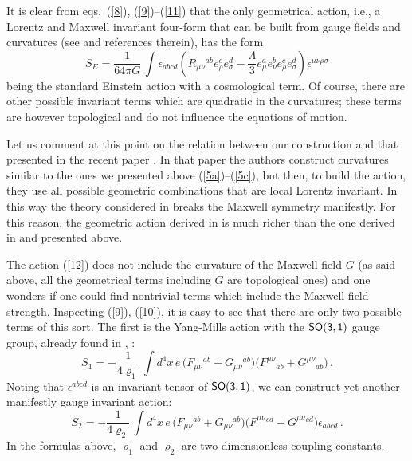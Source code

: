 \documentclass [prd,reprint,eqsecnum,nofootinbib]  {revtex4-1}
\begin{document}
It is clear from eqs.\ (\ref{8}), (\ref{9})--(\ref{11}) that the
only geometrical action, i.e., a Lorentz and Maxwell invariant
four-form that can be built from gauge fields and curvatures (see
\cite{Durka:2011nf} and references therein), has the form
\begin{equation}
S_{E} =\frac1{64\pi G}\,
\int\epsilon_{abcd}\left(R_{\mu\nu}{}^{ab}e_{\rho}^{c}e_{\sigma}^{d}
-\frac{\Lambda}{3}e_{\mu}^{a}e_{\nu}^{b}e_{\rho}^{ c}e_{\sigma}^{
d}\right)\epsilon^{\mu\nu\rho\sigma}\label{12}
\end{equation}
being the standard Einstein action with a cosmological term. Of
course, there are other possible invariant terms which are
quadratic in the curvatures; these terms are however topological
and do not influence the equations of motion.

Let us comment at this point on the relation between our construction
and that presented in the recent paper \cite{deAzcarraga:2010sw}. In
that paper the authors construct curvatures similar to the ones
we presented above (\ref{5a})--(\ref{5c}), but then, to build the
action, they use all possible geometric combinations that are local
Lorentz invariant. In this way the theory considered in
\cite{deAzcarraga:2010sw}
breaks the Maxwell symmetry manifestly.
For this reason, the geometric action derived in
\cite{deAzcarraga:2010sw} is much richer than the one derived in
\cite{Durka:2011nf} and presented above.

The action (\ref{12}) does not include the curvature of the Maxwell
field $G$ (as said above, all the geometrical terms including $G$ are
topological ones) and one wonders if one could find nontrivial
terms which include the Maxwell field strength. Inspecting
(\ref{9}), (\ref{10}), it is easy to see that there are only two
possible terms of this sort. The first is the Yang-Mills action with
the $\sf{SO(3,1)}$ gauge group, already found in
\cite{Soroka:2011tc}, \cite{Durka:2011nf}:
\begin{equation}\label{13}
  S_{1}= -  \frac1{4\varrho_1}\,\int d^4x\, e\, \big( F_{\mu\nu}{}^{ab} + G_{\mu\nu}{}^{ab}\big) \big( F^{\mu\nu}{}_{ab} +
    G^{\mu\nu}{}_{ab}\big)\, .
\end{equation}
Noting that $\epsilon^{abcd}$ is an invariant tensor of
$\sf{SO(3,1)}$, we can construct yet another manifestly gauge
invariant action:
\begin{equation}\label{13a}
  S_{2}= -  \frac1{4\varrho_2}\,\int d^4x\, e\, \big( F_{\mu\nu}{}^{ab} + G_{\mu\nu}{}^{ab}\big) \big( F^{\mu\nu}{}^{cd} +
    G^{\mu\nu}{}^{cd}\big) \epsilon_{abcd}\, .
\end{equation}
In the formulas above, $\varrho_1$ and $\varrho_2$ are two
dimensionless coupling constants.
\end{document}
